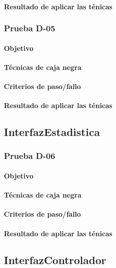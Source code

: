 \documentclass[10pt,a4paper]{article}
\begin{document}
			\paragraph{Resultado de aplicar las ténicas}
			\subsubsection{Prueba D-05}
			\paragraph{Objetivo}
			\paragraph{Técnicas de caja negra}
			\paragraph{Criterios de paso/fallo}
			\paragraph{Resultado de aplicar las ténicas}
	\subsection{InterfazEstadistica}
			\subsubsection{Prueba D-06}
			\paragraph{Objetivo}
			\paragraph{Técnicas de caja negra}
			\paragraph{Criterios de paso/fallo}
			\paragraph{Resultado de aplicar las ténicas}
	\subsection{InterfazControlador}
\end{document}
